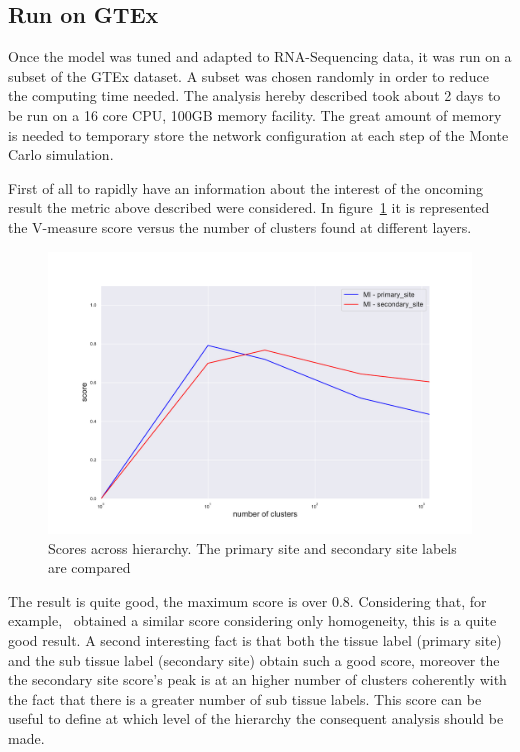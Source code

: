 \subsection{Run on GTEx}
Once the model was tuned and adapted to RNA-Sequencing data, it was run on a subset of the GTEx dataset. A subset was chosen randomly in order to reduce the computing time needed. The analysis hereby described took about 2 days to be run on a 16 core CPU, 100GB memory facility. The great amount of memory is needed to temporary store the network configuration at each step of the Monte Carlo simulation.

First of all to rapidly have an information about the interest of the oncoming result the metric above described were considered. In figure~\ref{fig:topic/gtex/oversigma_10tissue/metric_scores} it is represented the V-measure score versus the number of clusters found at different layers.
\begin{figure}[htb!]
    \centering
    \includegraphics[width=0.9\linewidth]{pictures/topic/gtex/oversigma_10tissue/metric_scores.pdf}
    \caption{Scores across hierarchy. The primary site and secondary site labels are compared}
    \label{fig:topic/gtex/oversigma_10tissue/metric_scores}
\end{figure}
The result is quite good, the maximum score is over $0.8$. Considering that, for example,~\cite{Farver2018} obtained a similar score considering only homogeneity, this is a quite good result. A second interesting fact is that both the tissue label (primary site) and the sub tissue label (secondary site) obtain such a good score, moreover the the secondary site score's peak is at an higher number of clusters coherently with the fact that there is a greater number of sub tissue labels.
This score can be useful to define at which level of the hierarchy the consequent analysis should be made.

